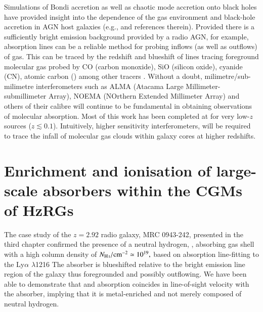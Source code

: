 Simulations of Bondi accretion as well as chaotic mode accretion onto black holes have provided insight into the dependence of the gas environment and black-hole accretion in AGN host galaxies (e.g., \citealt{Gaspari2013} and references therein). Provided there is a sufficiently bright emission background provided by a radio AGN, for example, absorption lines can be a reliable method for probing inflows (as well as outflows) of gas. This can be traced by the redshift and blueshift of lines tracing foreground molecular gas probed by CO (carbon monoxide), SiO (silicon oxide), cyanide (CN), atomic carbon () among other tracers \citep{David2014,Tremblay2016,Ruffa2019,Rose2019}. Without a doubt, milimetre/sub-milimetre interferometers such as ALMA (Atacama Large Millimeter-submillimeter Array), NOEMA (NOrthern Extended Millimeter Array) and others of their calibre will continue to be fundamental in obtaining observations of molecular absorption. Most of this work has been completed at for very low-$z$ sources ($z \lesssim 0.1$). Intuitively, higher sensitivity interferometers, will be required to trace the infall of molecular gas clouds within galaxy cores at higher redshifts. \\

\section{Enrichment and ionisation of large-scale absorbers within the CGMs of HzRGs}

The case study of the $z=2.92$ radio galaxy, MRC 0943-242, presented in the third chapter confirmed the presence of a neutral hydrogen, , absorbing gas shell with a high column density of $N_{\rm \ion{H}{i}}/\rm{cm}^{-2} \simeq 10^{19},$ based on absorption line-fitting to the Ly$\alpha$ $\lambda$1216 The absorber is blueshifted relative to the bright emission line region of the galaxy thus foregrounded and possibly outflowing. We have been able to demonstrate that  and  absorption coincides in line-of-sight velocity with the  absorber, implying that it is metal-enriched and not merely composed of neutral hydrogen. \\

